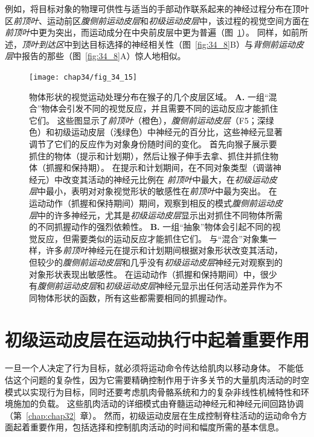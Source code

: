 例如，将目标对象的物理可供性与适当的手部动作联系起来的神经过程分布在顶叶区\textit{前顶叶}、运动前区\textit{腹侧前运动皮层}和\textit{初级运动皮层}中，该过程的视觉空间方面在 \textit{前顶叶}中更为突出，而运动成分在中央前皮层中更为普遍（图~\ref{fig:34_15}）。 
同样，如前所述，\textit{顶叶到达区}中到达目标选择的神经相关性（图~\ref{fig:34_8}B）与\textit{背侧前运动皮层}中报告的那些（图~\ref{fig:34_8}A）惊人地相似。


\begin{figure}[htbp]
	\centering
	\texttt{[image: chap34/fig\_34\_15]}
	\caption{物体形状的视觉运动处理分布在猴子的几个皮层区域\cite{schaffelhofer2016object}。
		\textbf{A.} 一组“混合”物体会引发不同的视觉反应，并且需要不同的运动反应才能抓住它们。
		这些图显示了\textit{前顶叶}（橙色），\textit{腹侧前运动皮层}（F5；深绿色）和初级运动皮层（浅绿色）中神经元的百分比，这些神经元显著调节了它们的反应作为对象身份随时间的变化。
		首先向猴子展示要抓住的物体（提示和计划期），然后让猴子伸手去拿、抓住并抓住物体（抓握和保持期）。
		在提示和计划期间，在不同对象类型（调谐神经元）中改变其活动的神经元比例在 \textit{前顶叶}中最大，在\textit{初级运动皮层}中最小，表明对对象视觉形状的敏感性在\textit{前顶叶}中最为突出。
		在运动动作（抓握和保持期间）期间，观察到相反的模式\textit{腹侧前运动皮层}中的许多神经元，尤其是\textit{初级运动皮层}显示出对抓住不同物体所需的不同抓握动作的强烈依赖性。
		\textbf{B.} 一组“抽象”物体会引起不同的视觉反应，但需要类似的运动反应才能抓住它们。
		与“混合”对象集一样，许多\textit{前顶叶}神经元在提示和计划期间根据对象形状改变其活动，但较少的\textit{腹侧前运动皮层}和几乎没有\textit{初级运动皮层}神经元对观察到的对象形状表现出敏感性。
		在运动动作（抓握和保持期间）中，很少有\textit{腹侧前运动皮层}和\textit{初级运动皮层}神经元显示出任何活动差异作为不同物体形状的函数，所有这些都需要相同的抓握动作。}
	\label{fig:34_15}
\end{figure}



\section{初级运动皮层在运动执行中起着重要作用}

一旦一个人决定了行为目标，就必须将运动命令传达给肌肉以移动身体。
不能低估这个问题的复杂性，因为它需要精确控制作用于许多关节的大量肌肉活动的时空模式以实现行为目标，同时还要考虑肌肉骨骼系统和力的复杂非线性机械特性和环境施加的负载。
这些肌肉活动的详细模式由脊髓运动神经元和神经元间回路协调（第~\ref{chap:chap32}~章）。
然而，初级运动皮层在生成控制脊柱活动的运动命令方面起着重要作用，包括选择和控制肌肉活动的时间和幅度所需的基本信息。



